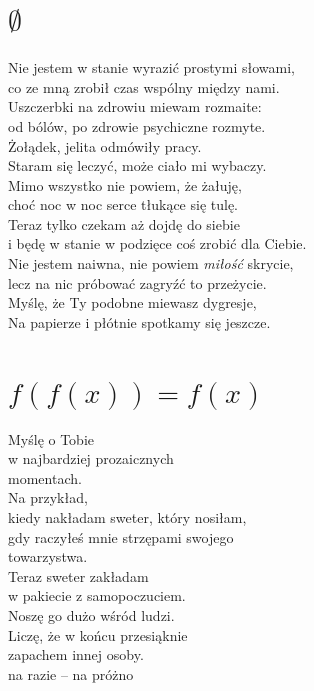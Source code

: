 \documentclass[12pt, a4paper]{memoir}
\renewenvironment{verse}{%
  \par\vspace{\baselineskip}\raggedright
}{
  \par\vspace{\baselineskip}
}
\begin{document}
\newpage
\section{$\emptyset$}
\begin{verse}
Nie jestem w stanie wyrazić prostymi słowami,\\
co ze mną zrobił czas wspólny między nami.\\[\baselineskip]

Uszczerbki na zdrowiu miewam rozmaite:\\
od bólów, po zdrowie psychiczne rozmyte.\\[\baselineskip]

Żołądek, jelita odmówiły pracy.\\
Staram się leczyć, może ciało mi wybaczy.\\[\baselineskip]

Mimo wszystko nie powiem, że żałuję,\\
choć noc w noc serce tłukące się tulę.\\[\baselineskip]

Teraz tylko czekam aż dojdę do siebie\\
i będę w stanie w podzięce coś zrobić dla Ciebie.\\[\baselineskip]

Nie jestem naiwna, nie powiem \textit{miłość} skrycie,\\
lecz na nic próbować zagryźć to przeżycie.\\[\baselineskip]

Myślę, że Ty podobne miewasz dygresje,\\
Na papierze i płótnie spotkamy się jeszcze.
\end{verse}

\newpage
\section[f(f(x)) = f(x)]{$f(f(x)) = f(x)$}
\begin{verse}
Myślę o Tobie\\
w najbardziej prozaicznych\\
momentach.\\[\baselineskip]

Na przykład,\\
kiedy nakładam sweter, który nosiłam,\\
gdy raczyłeś mnie strzępami swojego\\
towarzystwa.\\[\baselineskip]

Teraz sweter zakładam\\
w pakiecie z samopoczuciem.\\[\baselineskip]

Noszę go dużo wśród ludzi.\\
Liczę, że w końcu przesiąknie\\
zapachem innej osoby.\\[\baselineskip]

na razie -- na próżno
\end{verse}
\end{document}
